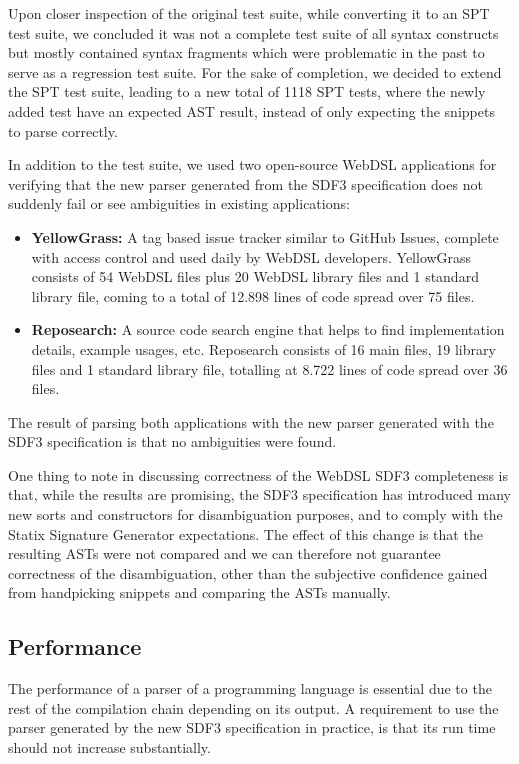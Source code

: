     Upon closer inspection of the original test suite, while converting it to an SPT test suite, we concluded it was not a complete test suite of all syntax constructs but mostly contained syntax fragments which were problematic in the past to serve as a regression test suite. For the sake of completion, we decided to extend the SPT test suite, leading to a new total of 1118 SPT tests, where the newly added test have an expected AST result, instead of only expecting the snippets to parse correctly.

    In addition to the test suite, we used two open-source WebDSL applications for verifying that the new parser generated from the SDF3 specification does not suddenly fail or see ambiguities in existing applications:

    \begin{itemize}
      \item \textbf{YellowGrass:} A tag based issue tracker similar to GitHub Issues, complete with access control and used daily by WebDSL developers. YellowGrass consists of 54 WebDSL files plus 20 WebDSL library files and 1 standard library file, coming to a total of 12.898 lines of code spread over 75 files.
      \item \textbf{Reposearch:} A source code search engine that helps to find implementation details, example usages, etc. Reposearch consists of 16 main files, 19 library files and 1 standard library file, totalling at 8.722 lines of code spread over 36 files.
    \end{itemize}

    The result of parsing both applications with the new parser generated with the SDF3 specification is that no ambiguities were found.

    One thing to note in discussing correctness of the WebDSL SDF3 completeness is that, while the results are promising, the SDF3 specification has introduced many new sorts and constructors for disambiguation purposes, and to comply with the Statix Signature Generator expectations. The effect of this change is that the resulting ASTs were not compared and we can therefore not guarantee correctness of the disambiguation, other than the subjective confidence gained from handpicking snippets and comparing the ASTs manually.

  \subsection{Performance}

    The performance of a parser of a programming language is essential due to the rest of the compilation chain depending on its output. A requirement to use the parser generated by the new SDF3 specification in practice, is that its run time should not increase substantially.


